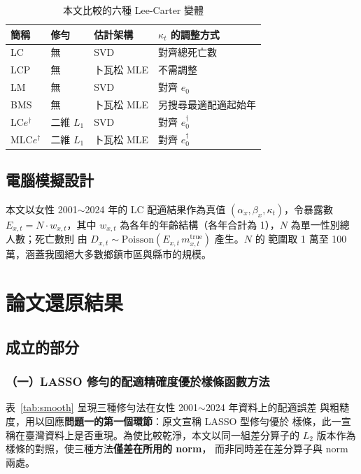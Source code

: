 \documentclass[UTF8, fontset=macnew, a4paper, 12pt]{ctexart}
\newcommand{\edag}{e_0^{\dagger}}
\newcommand{\LCe}{\mathrm{LC}e^{\dagger}}
\begin{document}
\begin{table}[H]
\centering
\caption{本文比較的六種 Lee-Carter 變體}
\small
\begin{tabular}{llll}
\toprule
簡稱 & 修勻 & 估計架構 & $\kappa_t$ 的調整方式\\
\midrule
LC      & 無 & SVD & 對齊總死亡數\\
LCP     & 無 & 卜瓦松 MLE & 不需調整\\
LM      & 無 & SVD & 對齊 $e_0$\\
BMS     & 無 & 卜瓦松 MLE & 另搜尋最適配適起始年\\
$\LCe$  & 二維 $L_1$ & SVD & 對齊 $\edag$\\
M$\LCe$ & 二維 $L_1$ & 卜瓦松 MLE & 對齊 $\edag$\\
\bottomrule
\end{tabular}
\label{tab:variants}
\end{table}

\subsection{電腦模擬設計}

本文以女性 2001$\sim$2024 年的 LC 配適結果作為真值
$(\alpha_x,\beta_x,\kappa_t)$，令暴露數 $E_{x,t}=N\cdot w_{x,t}$，其中
$w_{x,t}$ 為各年的年齡結構（各年合計為 1），$N$ 為單一性別總人數；死亡數則
由 $D_{x,t}\sim\text{Poisson}(E_{x,t}\,m^{\text{true}}_{x,t})$ 產生。$N$ 的
範圍取 1 萬至 100 萬，涵蓋我國絕大多數鄉鎮市區與縣市的規模。

\section{論文還原結果}

\subsection{成立的部分}

\subsubsection{（一）LASSO 修勻的配適精確度優於樣條函數方法}

表~\ref{tab:smooth} 呈現三種修勻法在女性 2001$\sim$2024 年資料上的配適誤差
與粗糙度，用以回應\textbf{問題一的第一個環節}：原文宣稱 LASSO 型修勻優於
樣條，此一宣稱在臺灣資料上是否重現。為使比較乾淨，本文以同一組差分算子的
$L_2$ 版本作為樣條的對照，使三種方法\textbf{僅差在所用的 norm}，
而非同時差在差分算子與 norm 兩處。
\end{document}
